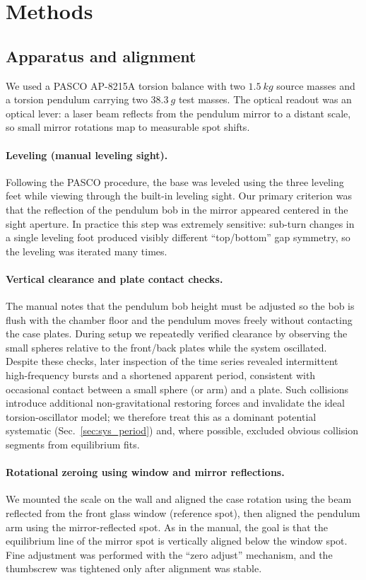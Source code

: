 \documentclass[11pt]{article}
\begin{document}
\section{Methods}
\subsection{Apparatus and alignment}

We used a PASCO AP-8215A torsion balance with two $\SI{1.5}{kg}$ source masses and a torsion pendulum carrying two $\SI{38.3}{g}$ test masses.
The optical readout was an optical lever: a laser beam reflects from the pendulum mirror to a distant scale, so small mirror rotations map to measurable spot shifts.

\paragraph*{Leveling (manual leveling sight).}
Following the PASCO procedure, the base was leveled using the three leveling feet while viewing through the built-in leveling sight.
Our primary criterion was that the reflection of the pendulum bob in the mirror appeared centered in the sight aperture.
In practice this step was extremely sensitive: sub-turn changes in a single leveling foot produced visibly different ``top/bottom'' gap symmetry, so the leveling was iterated many times.

\paragraph*{Vertical clearance and plate contact checks.}
The manual notes that the pendulum bob height must be adjusted so the bob is flush with the chamber floor and the pendulum moves freely without contacting the case plates.
During setup we repeatedly verified clearance by observing the small spheres relative to the front/back plates while the system oscillated.
Despite these checks, later inspection of the time series revealed intermittent high-frequency bursts and a shortened apparent period, consistent with occasional contact between a small sphere (or arm) and a plate.
Such collisions introduce additional non-gravitational restoring forces and invalidate the ideal torsion-oscillator model; we therefore treat this as a dominant potential systematic (Sec.~\ref{sec:sys_period}) and, where possible, excluded obvious collision segments from equilibrium fits.

\paragraph*{Rotational zeroing using window and mirror reflections.}
We mounted the scale on the wall and aligned the case rotation using the beam reflected from the front glass window (reference spot), then aligned the pendulum arm using the mirror-reflected spot.
As in the manual, the goal is that the equilibrium line of the mirror spot is vertically aligned below the window spot.
Fine adjustment was performed with the ``zero adjust'' mechanism, and the thumbscrew was tightened only after alignment was stable.
\end{document}
